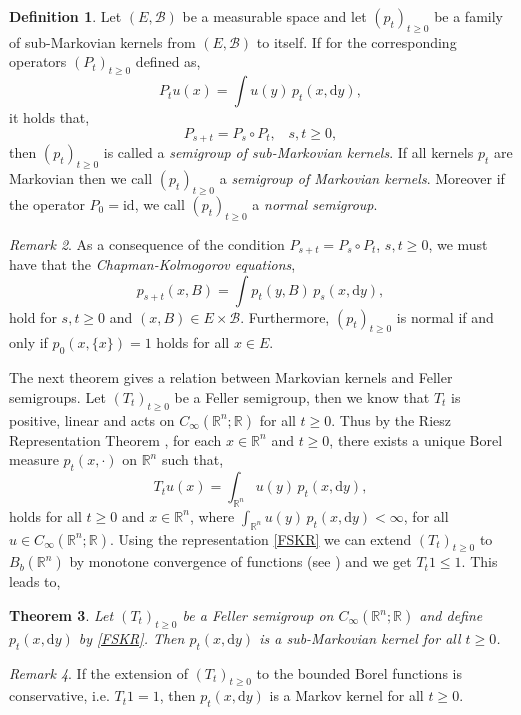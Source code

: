 \documentclass[a4paper, 12pt]{report}
\newtheorem{theorem}{Theorem}[section]
\theoremstyle{cor}
\theoremstyle{remark}
\newtheorem{remark}[theorem]{Remark}
\theoremstyle{definition}
\newtheorem{defn}[theorem]{Definition}
\begin{document}
\begin{defn}
Let $(E, \mathcal{B})$ be a measurable space and let $(p_t)_{t \ge 0}$ be a family of sub-Markovian kernels from $(E, \mathcal{B})$ to itself.  If for the corresponding operators $(P_t)_{t \ge 0}$ defined as,
$$
P_tu(x) = \int u(y)\,p_t(x, \mathrm{d}y),
$$
it holds that,
$$
P_{s + t} = P_s\circ P_t, \,\,\,\,\, s, t \ge 0,
$$
then $(p_t)_{t \ge 0}$ is called a \emph{semigroup of sub-Markovian kernels}.  If all kernels $p_t$ are Markovian then we call $(p_t)_{t \ge 0}$ a \emph{semigroup of Markovian kernels}.  Moreover if the operator $P_0 = \mathrm{id}$, we call $(p_t)_{t \ge 0}$ a \emph{normal semigroup}.
\end{defn}
\begin{remark}
As a consequence of the condition $P_{s + t} = P_s \circ P_t$, $s, t \ge 0$, we must have that the \emph{Chapman-Kolmogorov equations},
\begin{equation}
p_{s + t}(x, B) = \int p_t(y, B)\,p_s(x, \mathrm{d}y),
\end{equation}
hold for $s, t \ge 0$ and $(x, B) \in E \times \mathcal{B}$.  Furthermore, $(p_t)_{t \ge 0}$ is normal if and only if $p_0(x, \{x\}) = 1$ holds for all $x \in E$.
\end{remark}
The next theorem gives a relation between Markovian kernels and Feller semigroups.  Let $(T_t)_{t \ge 0}$ be a Feller semigroup, then we know that $T_t$ is positive, linear and acts on $C_\infty(\mathbb{R}^n; \mathbb{R})$ for all $t \ge 0$.  Thus by the Riesz Representation Theorem \cite[Theorem 2.3.4]{Vol1}, for each $x \in \mathbb{R}^n$ and $t \ge 0$, there exists a unique Borel measure $p_t(x, \cdot)$ on $\mathbb{R}^n$ such that,
\begin{equation}\label{FSKR}
T_tu(x) = \int_{\mathbb{R}^n}u(y)\,p_t(x, \mathrm{d}y),
\end{equation}
holds for all $t \ge 0$ and $x \in \mathbb{R}^n$, where $\int_{\mathbb{R}^n}u(y)\,p_t(x, \mathrm{d}y) < \infty$, for all $u \in C_\infty(\mathbb{R}^n; \mathbb{R})$.  Using the representation \eqref{FSKR} we can extend $(T_t)_{t \ge 0}$ to $B_b(\mathbb{R}^n)$ by monotone convergence of functions (see \cite{Vol1}) and we get $T_t1 \le 1$.  This leads to,

\begin{theorem}
Let $(T_t)_{t \ge 0}$ be a Feller semigroup on $C_\infty(\mathbb{R}^n; \mathbb{R})$ and define $p_t(x, \mathrm{d}y)$ by \eqref{FSKR}.  Then $p_t(x, \mathrm{d}y)$ is a sub-Markovian kernel for all $t \ge 0$.
\end{theorem}
\begin{remark}
If the extension of $(T_t)_{t \ge 0}$ to the bounded Borel functions is conservative, i.e. $T_t1 = 1$, then $p_t(x, \mathrm{d}y)$ is a Markov kernel for all $t \ge 0$.
\end{remark}
\end{document}
